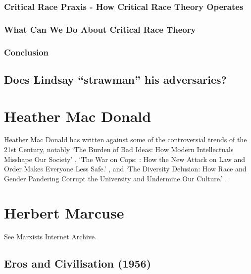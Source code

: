 \documentclass[10pt,titlepage]{book}
\newcommand{\ignore}[1]{}
\begin{document}
\subsubsection{Critical Race Praxis - How Critical Race Theory Operates}

\subsubsection{What Can We Do About Critical Race Theory}

\subsubsection{Conclusion}

\subsection{Does Lindsay ``strawman'' his adversaries?}

\ignore{

This has been alleged.
While not by any means constituting an authority on Lindsay, the accusation strikes me as so far off the mark that I wanted to respond with a short twitter thread.

This section is to play with that idea, it might not get anywhere, its probably too hard to do it in a small number of words.

}%

\section{Heather Mac Donald \cite{macdonald-bbi, macdonald-woc, macdonald-tdd}}

Heather Mac Donald has written against some of the controversial trends of the 21st Century, notably `The Burden of Bad Ideas: How Modern Intellectuals Misshape Our Society' \cite{macdonald-bbi}, `The War on Cops: : How the New Attack
on Law and Order Makes Everyone Less Safe.' \cite{macdonald-woc}, and `The Diversity Delusion: How Race and
Gender Pandering Corrupt the University and Undermine Our
Culture.' \cite{macdonald-tdd}.

\section{Herbert Marcuse}

See Marxists Internet Archive\cite{marcuse-mia}.

\subsection{Eros and Civilisation (1956) \cite{marcuse1956eros}}
\end{document}
